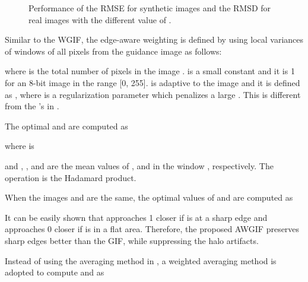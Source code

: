 \documentclass[a4paper,fleqn]{cas-dc}
\begin{document}
\begin{figure*}[htp]
	\centering
{}
\caption{Performance of the RMSE for synthetic images and the RMSD for real images with the different value of .}
	\label{fig:beta_selection}
	\vspace*{-0.4cm}
\end{figure*}

Similar to the WGIF, the edge-aware weighting  is defined  by using local variances of  windows of all pixels from the guidance image  as follows:

where  is the total number of pixels in the image .   is a small constant and it is 1 for an 8-bit image in the range [0, 255].
 is adaptive to the image  and it is defined as , where  is a regularization parameter which penalizes a large . This is different from the 's in  \cite{he2013guided,li2015weighted,chen2020weighted}.

The optimal  and  are computed as

where  is

and , , and   are the mean values of ,  and  in the window ,  respectively. The operation  is the Hadamard product.

When the images  and  are the same, the optimal values of  and  are computed as


It can be easily shown that  approaches 1 closer if  is at a sharp edge and approaches 0 closer if  is in a flat area. Therefore, the proposed AWGIF preserves sharp edges better than the GIF, while suppressing the halo artifacts.

Instead of using the averaging method in \cite{he2013guided,li2015weighted}, a weighted averaging method is adopted to compute  and  as
\end{document}
